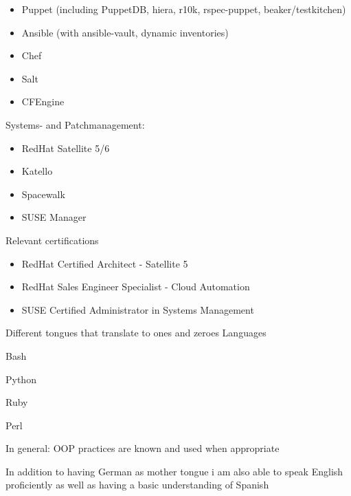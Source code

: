 \begin{cventries}
{\begin{cvitems}
          \begin{itemize}
            \item Puppet (including PuppetDB, hiera, r10k, rspec-puppet, beaker/testkitchen)
            \item Ansible (with ansible-vault, dynamic inventories)
            \item Chef
            \item Salt
            \item CFEngine
          \end{itemize}
        \item Systems- and Patchmanagement:
        \begin{itemize}
          \item RedHat Satellite 5/6
          \item Katello
          \item Spacewalk
          \item SUSE Manager
        \end{itemize}
        \item Relevant certifications
          \begin{itemize}
            \item RedHat Certified Architect - Satellite 5
            \item RedHat Sales Engineer Specialist - Cloud Automation
            \item SUSE Certified Administrator in Systems Management
          \end{itemize}
      \end{cvitems}
    }
  \cventry
    {Different tongues that translate to ones and zeroes}
    {Languages}
    {}
    {}
    {
      \begin{cvitems}
        \item Bash
        \item Python
        \item Ruby
        \item Perl
        \item In general: OOP practices are known and used when appropriate
      \end{cvitems}
    }
\end{cventries}


\begin{cvparagraph}
In addition to having German as mother tongue i am also able to speak English proficiently as well as having a basic understanding of Spanish
\end{cvparagraph}

